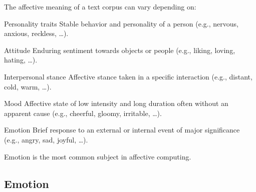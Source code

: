 The affective meaning of a text corpus can vary depending on:
\begin{descriptionlist}
    \item[Personality traits] 
        Stable behavior and personality of a person (e.g., nervous, anxious, reckless, \dots).

    \item[Attitude] 
        Enduring sentiment towards objects or people (e.g., liking, loving, hating, \dots).

    \item[Interpersonal stance] 
        Affective stance taken in a specific interaction (e.g., distant, cold, warm, \dots).

    \item[Mood] 
        Affective state of low intensity and long duration often without an apparent cause (e.g., cheerful, gloomy, irritable, \dots).

    \item[Emotion] 
        Brief response to an external or internal event of major significance (e.g., angry, sad, joyful, \dots).

        \begin{remark}
            Emotion is the most common subject in affective computing.
        \end{remark}
\end{descriptionlist}


\subsection{Emotion}

